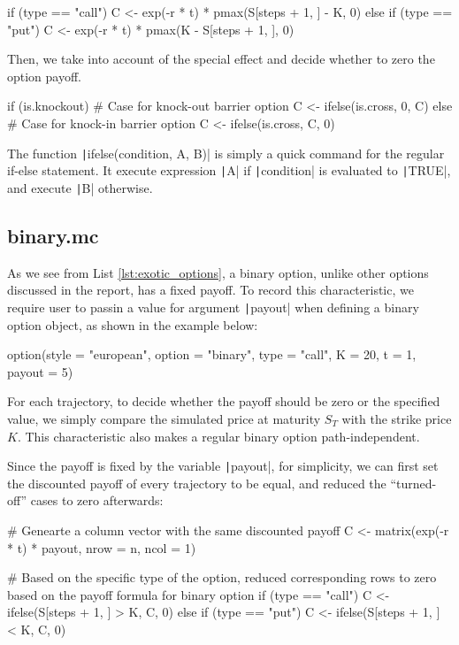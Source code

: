 \begin{Rminted}
if (type == "call") {
    C <- exp(-r * t) * pmax(S[steps + 1, ] - K, 0)
} else if (type == "put") {
    C <- exp(-r * t) * pmax(K - S[steps + 1, ], 0)
}
\end{Rminted}

Then, we take into account of the special effect and decide whether to zero the option payoff.

\begin{Rminted}
if (is.knockout) { # Case for knock-out barrier option
    C <- ifelse(is.cross, 0, C)
} else { # Case for knock-in barrier option
    C <- ifelse(is.cross, C, 0)
}
\end{Rminted}

The function \texttt|ifelse(condition, A, B)| is simply a quick command for the regular if-else statement. It execute expression \texttt|A| if \texttt|condition| is evaluated to \texttt|TRUE|, and execute \texttt|B| otherwise.

\subsection{binary.mc}

As we see from List \ref{lst:exotic_options}, a binary option, unlike other options discussed in the report, has a fixed payoff. To record this characteristic, we require user to passin a value for argument \texttt|payout| when defining a binary option object, as shown in the example below:

\begin{Rminted}
option(style = "european", option = "binary", type = "call", K = 20, t = 1, payout = 5)
\end{Rminted}

For each trajectory, to decide whether the payoff should be zero or the specified value, we simply compare the simulated price at maturity $S_T$ with the strike price $K$. This characteristic also makes a regular binary option path-independent.

Since the payoff is fixed by the variable \texttt|payout|, for simplicity, we can first set the discounted payoff of every trajectory to be equal, and reduced the ``turned-off'' cases to zero afterwards:

\begin{Rminted}
# Genearte a column vector with the same discounted payoff
C <- matrix(exp(-r * t) * payout, nrow = n, ncol = 1)

# Based on the specific type of the option, reduced corresponding rows to zero based on the payoff formula for binary option
if (type == "call") {
    C <- ifelse(S[steps + 1, ] > K, C, 0)
} else if (type == "put") {
    C <- ifelse(S[steps + 1, ] < K, C, 0)
}
\end{Rminted}

